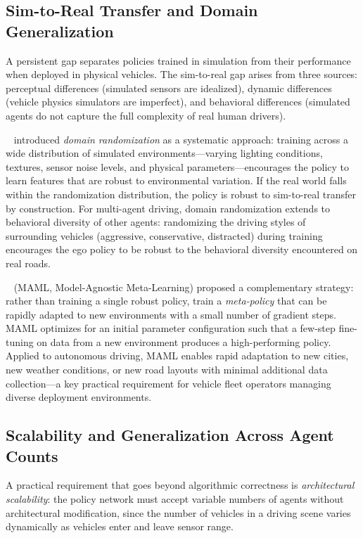 \documentclass[12pt, a4paper]{article}
\begin{document}
\subsection{Sim-to-Real Transfer and Domain Generalization}

A persistent gap separates policies trained in simulation from their
performance when deployed in physical vehicles.  The sim-to-real gap
arises from three sources: perceptual differences (simulated sensors are
idealized), dynamic differences (vehicle physics simulators are imperfect),
and behavioral differences (simulated agents do not capture the full
complexity of real human drivers).

\citeauthor{tobin2017domain}~\cite{tobin2017domain} introduced
\emph{domain randomization} as a systematic approach: training across a wide
distribution of simulated environments---varying lighting conditions, textures,
sensor noise levels, and physical parameters---encourages the policy to learn
features that are robust to environmental variation.  If the real world falls
within the randomization distribution, the policy is robust to sim-to-real
transfer by construction.  For multi-agent driving, domain randomization
extends to behavioral diversity of other agents: randomizing the driving
styles of surrounding vehicles (aggressive, conservative, distracted)
during training encourages the ego policy to be robust to the behavioral
diversity encountered on real roads.

\citeauthor{finn2017model}~\cite{finn2017model} (MAML, Model-Agnostic
Meta-Learning) proposed a complementary strategy: rather than training a
single robust policy, train a \emph{meta-policy} that can be rapidly adapted
to new environments with a small number of gradient steps.  MAML optimizes
for an initial parameter configuration such that a few-step fine-tuning on
data from a new environment produces a high-performing policy.  Applied to
autonomous driving, MAML enables rapid adaptation to new cities, new weather
conditions, or new road layouts with minimal additional data collection---a
key practical requirement for vehicle fleet operators managing diverse
deployment environments.

\subsection{Scalability and Generalization Across Agent Counts}

A practical requirement that goes beyond algorithmic correctness is
\emph{architectural scalability}: the policy network must accept variable
numbers of agents without architectural modification, since the number of
vehicles in a driving scene varies dynamically as vehicles enter and leave
sensor range.
\end{document}
